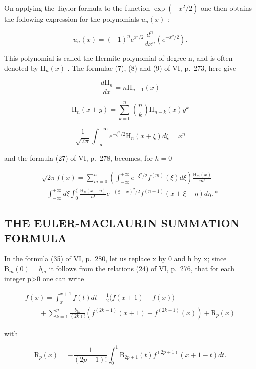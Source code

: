 On applying the Taylor formula to the function \(\exp(-x^2/2)\) one then obtains the following expression for the polynomials \(u_n(x)\) :

\[
u _ {n} (x) = (- 1) ^ {n} e ^ {x ^ {2} / 2} \frac {d ^ {n}}{d x ^ {n}} (e ^ {- x ^ {2} / 2}).
\]

This polynomial is called the Hermite polynomial of degree n, and is often denoted by \(\mathrm{H}_{n}(x)\) . The formulae (7), (8) and (9) of VI, p.~273, here give

\[
\frac {d \mathrm{H} _ {n}}{d x} = n \mathrm{H} _ {n - 1} (x)
\]

\[
\mathrm{H} _ {n} (x + y) = \sum_ {k = 0} ^ {n} {\binom {n} {k}} \mathrm{H} _ {n - k} (x)   y ^ {k}
\]

\[
\frac {1}{\sqrt {2 \pi}} \int_ {- \infty} ^ {+ \infty} e ^ {- \xi^ {2} / 2} \mathrm{H} _ {n} (x + \xi) d \xi = x ^ {n}
\]

and the formula (27) of VI, p.~278, becomes, for \(h = 0\)

\[
\begin{array}{l} \sqrt {2 \pi} f (x) = \sum_ {m = 0} ^ {n} \left(\int_ {- \infty} ^ {+ \infty} e ^ {- \xi^ {2} / 2} f ^ {(m)} (\xi) d \xi\right) \frac {\mathrm{H} _ {m} (x)}{m !} \\ - \int_ {- \infty} ^ {+ \infty} d \xi \int_ {0} ^ {\xi} \frac {\mathrm{H} _ {n} (x + \eta)}{n !} e ^ {- (\xi + x) ^ {2} / 2} f ^ {(n + 1)} (x + \xi - \eta) d \eta . * \end{array}
\]

\subsection{THE EULER-MACLAURIN SUMMATION FORMULA}

In the formula (35) of VI, p.~280, let us replace x by 0 and h by x; since \(\mathrm{B}_{m}(0)=b_{m}\) it follows from the relations (24) of VI, p.~276, that for each integer p\textgreater0 one can write

\[
\begin{array}{l} f (x) = \int_ {x} ^ {x + 1} f (t) d t - \frac {1}{2} \big (f (x + 1) - f (x) \big) \\ \qquad + \sum_ {k = 1} ^ {p} \frac {b _ {2 k}}{(2 k) !} \left(f ^ {(2 k - 1)} (x + 1) - f ^ {(2 k - 1)} (x)\right) + \mathrm{R} _ {p} (x) \end{array}\tag{37}
\]

with

\[
\mathrm{R} _ {p} (x) = - \frac {1}{(2 p + 1) !} \int_ {0} ^ {1} \mathrm{B} _ {2 p + 1} (t) f ^ {(2 p + 1)} (x + 1 - t) d t.\tag{38}
\]

